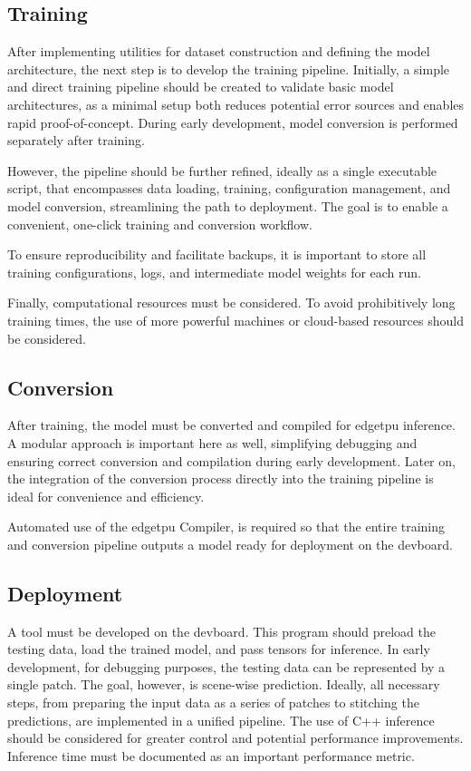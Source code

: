 {\subsection*{Training}

After implementing utilities for dataset construction and defining the model architecture, the next step is to develop the training pipeline.
Initially, a simple and direct training pipeline should be created to validate basic model architectures, as a minimal setup both reduces potential error sources and enables rapid proof-of-concept.
During early development, model conversion is performed separately after training.

However, the pipeline should be further refined, ideally as a single executable script, that encompasses data loading, training, configuration management, and model conversion,
streamlining the path to deployment. The goal is to enable a convenient, one-click training and conversion workflow.

To ensure reproducibility and facilitate backups, it is important to store all training configurations, logs, and intermediate model weights for each run.

Finally, computational resources must be considered. To avoid prohibitively long training times, the use of more powerful machines or cloud-based resources should be considered.

\subsection*{Conversion}

After training, the model must be converted and compiled for \gls{edgetpu} inference.
A modular approach is important here as well, simplifying debugging and ensuring correct conversion and compilation during early development.
Later on, the integration of the conversion process directly into the training pipeline is ideal for convenience and efficiency.

Automated use of the \gls{edgetpu} Compiler,
is required so that the entire training and conversion pipeline outputs a model ready for deployment on the \gls{devboard}.

\subsection*{Deployment}

A tool must be developed on the \gls{devboard}. This program should preload the testing data, load the trained model, and pass
tensors for inference. In early development, for debugging purposes, the testing data can be represented by a single patch.
The goal, however, is scene-wise prediction. Ideally, all necessary steps, from preparing the input data as a series of patches
to stitching the predictions, are implemented in a unified pipeline. The use of C++ inference should be considered for greater control
and potential performance improvements. Inference time must be documented as an important performance metric.

}
